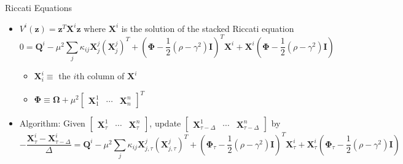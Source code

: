 \documentclass[
  10pt,
  aspectratio=169,   %
]{beamer}
\theoremstyle{plain}
\begin{document}
\begin{frame}{Riccati Equations}
  \label{riccati}
  \begin{itemize}
    \item $V^{i}\left(\bm{z}\right)=\bm{z}^{T}\bm{X}^{i}\bm{z}$ where $\bm{X}^{i}$ is the solution of the stacked Riccati equation
            {\small
              \[
                0=\bm{Q}^{i}-\mu^{2}\sum_{j}\kappa_{ij}\bm{X}_{j}^{j}\left(\bm{X}_{j}^{j}\right)^{T}+\left(\bm{\Phi}-\frac{1}{2}\left(\rho-\gamma^{2}\right)\bm{I}\right)^{T}\bm{X}^{i}+\bm{X}^{i}\left(\bm{\Phi}-\frac{1}{2}\left(\rho-\gamma^{2}\right)\bm{I}\right)
              \]}
          \begin{itemize}
            \item $\bm{X}_{i}^{i}\equiv$ the $i$th column of $\bm{X}^{i}$
            \item $\bm{\Phi}\equiv\bm{\Omega}+\mu^{2}\left[\begin{array}{ccc}\bm{X}_{1}^{1} & \cdots & \bm{X}_{n}^{n}\end{array}\right]^{T}$
          \end{itemize}
          \medskip{}
    \item Algorithm: Given $\left[\begin{array}{ccc}\bm{X}_{\tau}^{1} & \cdots & \bm{X}_{\tau}^{n}\end{array}\right]$, update $\left[\begin{array}{ccc}\bm{X}_{\tau-\Delta}^{1} & \cdots & \bm{X}_{\tau-\Delta}^{n}\end{array}\right]$ by
            {\small
              \[
                -\frac{\bm{X}_{\tau}^{i}-\bm{X}_{\tau-\Delta}^{i}}{\Delta}=\bm{Q}^{i}-\mu^{2}\sum_{j}\kappa_{ij}\bm{X}_{j,\tau}^{j}\left(\bm{X}_{j,\tau}^{j}\right)^{T}+\left(\bm{\Phi}_{\tau}-\frac{1}{2}\left(\rho-\gamma^{2}\right)\bm{I}\right)^{T}\bm{X}_{\tau}^{i}+\bm{X}_{\tau}^{i}\left(\bm{\Phi}_{\tau}-\frac{1}{2}\left(\rho-\gamma^{2}\right)\bm{I}\right)
              \]}
  \end{itemize}
  \hyperlink{hjb}{}
\end{frame}
\end{document}
